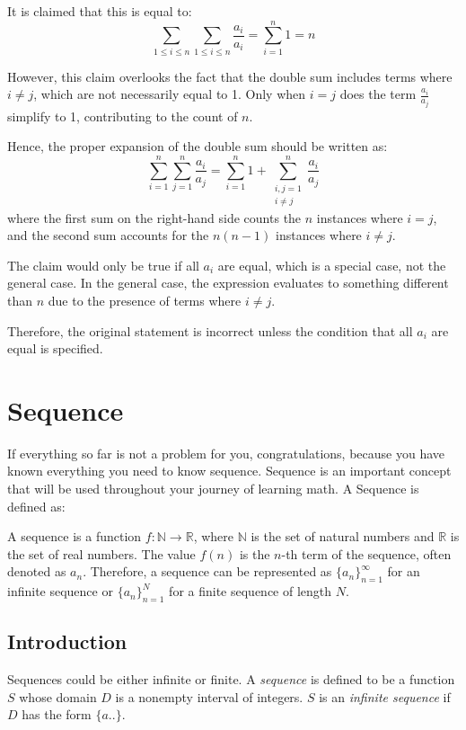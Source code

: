 \documentclass[
	12pt, %
	fleqn, %
	a4paper, %
]{LegrandOrangeBook}
\begin{document}
It is claimed that this is equal to:
\[
\sum_{1 \leq i \leq n} \sum_{1 \leq i \leq n} \frac{a_i}{a_i} = \sum_{i=1}^{n} 1 = n
\]

However, this claim overlooks the fact that the double sum includes terms where \( i \neq j \), which are not necessarily equal to 1. Only when \( i = j \) does the term \( \frac{a_i}{a_j} \) simplify to 1, contributing to the count of \( n \).

Hence, the proper expansion of the double sum should be written as:
\[
\sum_{i=1}^{n} \sum_{j=1}^{n} \frac{a_i}{a_j} = \sum_{i=1}^{n} 1 + \sum_{\substack{i,j=1 \\ i \neq j}}^{n} \frac{a_i}{a_j}
\]
where the first sum on the right-hand side counts the \( n \) instances where \( i = j \), and the second sum accounts for the \( n(n-1) \) instances where \( i \neq j \).

The claim would only be true if all \( a_i \) are equal, which is a special case, not the general case. In the general case, the expression evaluates to something different than \( n \) due to the presence of terms where \( i \neq j \). 

Therefore, the original statement is incorrect unless the condition that all \( a_i \) are equal is specified.

\section{Sequence}
If everything so far is not a problem for you, congratulations, because you have known everything you need to know sequence. Sequence is an important concept that will be used throughout your journey of learning math. A Sequence
is defined as:
\begin{definition}
    A sequence is a function \( f: \mathbb{N} \to \mathbb{R} \), where \(\mathbb{N}\) is the set of natural numbers and \(\mathbb{R}\) is the set of real numbers. The value \( f(n) \) 
    is the \( n \)-th term of the sequence, often denoted as \( a_n \). Therefore, a sequence can be represented as \( \{a_n\}_{n=1}^{\infty} \) for an infinite sequence or \( \{a_n\}_{n=1}^{N} \) for a finite sequence of length \( N \).
\end{definition} 

\subsection{Introduction}
Sequences could be either infinite or finite. A \textit{sequence} is defined to be a function \( S \) whose domain \( D \) is a nonempty interval of integers. \( S \) is an \textit{infinite sequence} if \( D \) has the form \( \{a..\} \). %
\end{document}
